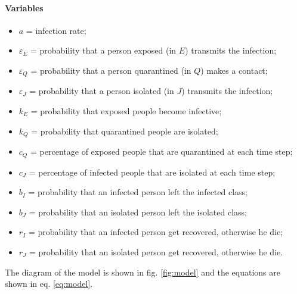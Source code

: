 \documentclass[12pt]{llncs}
\begin{document}
\paragraph{Variables}
\begin{itemize}
\item $a$ = infection rate;
\item $\varepsilon_E$ = probability that a person exposed (in $E$) transmits the infection;
\item $\varepsilon_Q$ = probability that a person quarantined (in $Q$) makes a contact;
\item $\varepsilon_J$ = probability that a person isolated (in $J$) transmits the infection;
\item $k_E$ = probability that exposed people become infective;
\item $k_Q$ = probability that quarantined people are isolated;
\item $c_Q$ = percentage of exposed people that are quarantined at each time step;
\item $c_J$ = percentage of infected people that are isolated at each time step;
\item $b_I$ = probability that an infected person left the infected class;
\item $b_J$ = probability that an isolated person left the isolated class;
\item $r_I$ = probability that an infected person get recovered, otherwise he die;
\item $r_J$ = probability that an isolated person get recovered, otherwise he die.
\end{itemize}
The diagram of the model is shown in fig. \ref{fig:model} and the equations are shown in eq. \ref{eq:model}.
\end{document}
